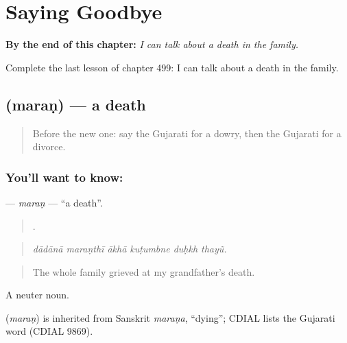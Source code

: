 
\chapter{Saying Goodbye}
\label{ch:gu-saying-goodbye}

\begin{chapteropening}
\textbf{By the end of this chapter:} \emph{I can talk about a death in the family.}

Complete the last lesson of chapter 499: I can talk about a death in the family.
\end{chapteropening}

\section[\texorpdfstring{\gu{મરણ} (maraṇ)}{મરણ (maraṇ)}]{ (maraṇ) — a death}

\label{lesson:GU-C499-maran}



\begin{quote}
Before the new one: say the Gujarati for a dowry, then the Gujarati for a divorce.
\end{quote}

\subsection*{You'll want to know: }
\textbf{} — \emph{maraṇ} — \textquotedblleft{}a death\textquotedblright{}.

\begin{quote}
     .
\end{quote}

\begin{quote}
\emph{dādānā maraṇthī ākhā kuṭumbne duḥkh thayũ.}
\end{quote}

\begin{quote}
The whole family grieved at my grandfather's death.
\end{quote}

A neuter noun.

\begin{cousinweb}
\textbf{} (\emph{maraṇ}) is inherited from Sanskrit \emph{maraṇa}, \textquotedblleft{}dying\textquotedblright{}; CDIAL lists the Gujarati word (CDIAL 9869).
\end{cousinweb}

